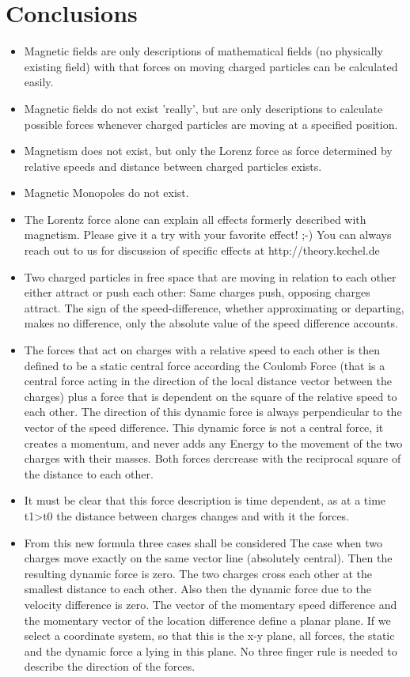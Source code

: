 \documentclass[12pt,a4paper,twocolumn]{article}
\begin{document}
\section{Conclusions}
\begin{itemize}
  \item Magnetic fields are only descriptions of mathematical fields (no physically existing field) with that forces on moving charged particles can be calculated easily.
  \item Magnetic fields do not exist 'really', but are only descriptions to calculate possible forces whenever charged particles are moving at a specified position.
  \item Magnetism does not exist, but only the Lorenz force as force determined by relative speeds and distance between charged particles exists.
  \item Magnetic Monopoles do not exist.
  \item The Lorentz force alone can explain all effects formerly described with magnetism. Please give it a try with your favorite effect! ;-) You can always reach out to us for discussion of specific effects at http://theory.kechel.de
  \item Two charged particles in free space that are moving in relation to each other either attract or push each other: Same charges push, opposing charges attract. The sign of the speed-difference, whether approximating or departing, makes no difference, only the absolute value of the speed difference accounts.
  \item The forces that act on charges with a relative speed to each other is then defined to be a static central force according the Coulomb Force (that is a central force acting in the direction of the local distance vector between the charges) plus a force that is dependent on the square of the relative speed to each other. The direction of this dynamic force is always perpendicular to the vector of the speed difference. This dynamic force is not a central force, it creates a momentum, and never adds any Energy to the movement of the two charges with their masses. Both forces dercrease with the reciprocal square of the distance to each other.
  \item It must be clear that this force description is time dependent, as at a time t1>t0 the distance between charges changes and with it the forces.
  \item From this new formula three cases shall be considered
  \subitem The case when two charges move exactly on the same vector line (absolutely central). Then the resulting dynamic force is zero.
  \subitem The two charges cross each other at the smallest distance to each other. Also then the dynamic force due to the velocity difference is zero.
  \subitem The vector of the momentary speed difference and the momentary vector of the location difference define a planar plane. If we select a coordinate system, so that this is the x-y plane, all forces, the static and the dynamic force a lying in this plane. No three finger rule is needed to describe the direction of the forces.
\end{itemize}
\end{document}
